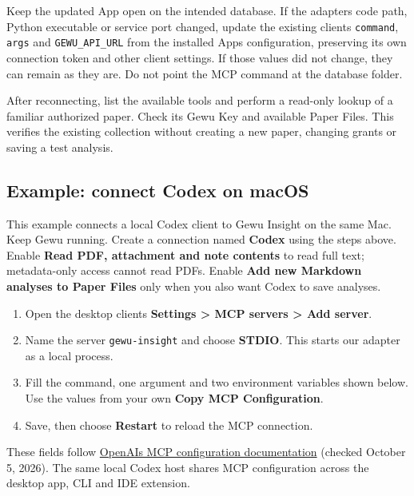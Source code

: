 \documentclass[10pt,letterpaper,oneside]{scrreprt}
\providecommand{\tightlist}{\setlength{\itemsep}{1pt}\setlength{\parskip}{0pt}}
\begin{document}
Keep the updated App open on the intended database. If the adapter\textquotesingle s code path, Python executable or service port changed, update the existing client\textquotesingle s \texttt{command}, \texttt{args} and \texttt{GEWU\_API\_URL} from the installed App\textquotesingle s configuration, preserving its own connection token and other client settings. If those values did not change, they can remain as they are. Do not point the MCP command at the database folder.

After reconnecting, list the available tools and perform a read-only lookup of a familiar authorized paper. Check its Gewu Key and available Paper Files. This verifies the existing collection without creating a new paper, changing grants or saving a test analysis.

\subsection{Example: connect Codex on macOS}\label{example-connect-codex-on-macos}

This example connects a local Codex client to Gewu Insight on the same Mac. Keep Gewu running. Create a connection named \textbf{Codex} using the steps above. Enable \textbf{Read PDF, attachment and note contents} to read full text; metadata-only access cannot read PDFs. Enable \textbf{Add new Markdown analyses to Paper Files} only when you also want Codex to save analyses.

\begin{enumerate}
\tightlist
\item
  Open the desktop client\textquotesingle s \textbf{Settings \textgreater{} MCP servers \textgreater{} Add server}.
\item
  Name the server \texttt{gewu-insight} and choose \textbf{STDIO}. This starts our adapter as a local process.
\item
  Fill the command, one argument and two environment variables shown below. Use the values from your own \textbf{Copy MCP Configuration}.
\item
  Save, then choose \textbf{Restart} to reload the MCP connection.
\end{enumerate}

These fields follow \href{https://learn.chatgpt.com/docs/extend/mcp?surface=app}{OpenAI\textquotesingle s MCP configuration documentation} (checked October 5, 2026). The same local Codex host shares MCP configuration across the desktop app, CLI and IDE extension.
\end{document}
